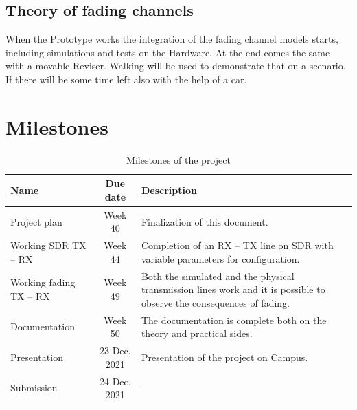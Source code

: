 \documentclass[a4paper, twosided, 11pt]{scrartcl}
\begin{document}
\subsection{Theory of fading channels}
When the Prototype works the integration of the fading channel models starts, including simulations and tests on the Hardware. 
At the end comes the same with a movable Reviser. Walking will be used to demonstrate that on a scenario. If there will be some time left also with the help of a car.

\newpage
\section{Milestones}

\begin{table}[h]
	\centering
	\caption{Milestones of the project}
	\renewcommand\arraystretch{1.2}
	\begin{tabularx}{\linewidth}{l c X}
		\toprule
		\bfseries Name & \bfseries Due date & \bfseries Description \\
		\midrule
		Project plan & Week 40 & 
			Finalization of this document. \\

		Working SDR TX -- RX  & Week 44 &
			Completion of an RX -- TX line on SDR with variable parameters for configuration. \\

		Working fading TX -- RX & Week 49 &
			Both the simulated and the physical transmission lines work and it is possible to observe the consequences of fading.\\

		Documentation & Week 50 &
			The documentation is complete both on the theory and practical sides. \\

		Presentation & 23 Dec. 2021 &
			Presentation of the project on Campus. \\
		Submission & 24 Dec. 2021 & --- \\
		\bottomrule
	\end{tabularx}
\end{table}

\appendix
\end{document}
